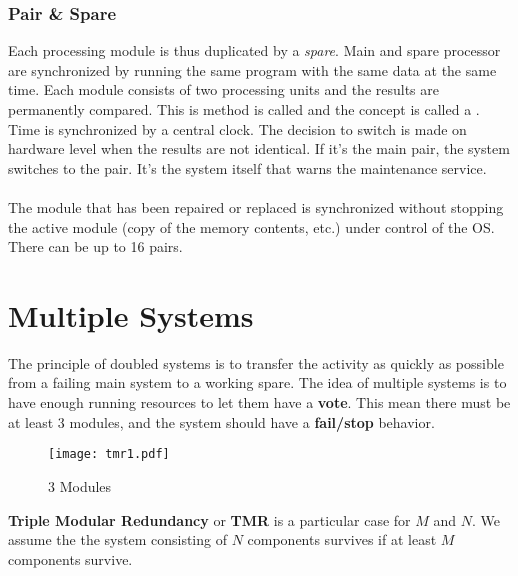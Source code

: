 \documentclass[../main.tex]{subfiles}
\begin{document}
\subsubsection{Pair \& Spare}
Each processing module is thus duplicated by a \textit{spare}.
Main and spare processor are synchronized by running the same program with the same data at the same time.
Each module consists of two processing units and the results are permanently compared.
This is method is called  and the concept is called a .
Time is synchronized by a central clock.
The decision to switch is made on hardware level when the results are not identical.
If it's the main pair, the system switches to the pair.
It's the system itself that warns the maintenance service. 
\\\\
The module that has been repaired or replaced is synchronized without stopping the active module (copy of the memory contents, etc.) under control of the OS. There can be up to 16 pairs.

\section{Multiple Systems}
The principle of doubled systems is to transfer the activity as quickly as possible from a failing main system to a working spare. The idea of multiple systems is to have enough running resources to let them have a \textbf{vote}. This mean there must be at least 3 modules, and the system should have a \textbf{fail/stop} behavior.

\begin{figure}[H]
    \centering
    \texttt{[image: tmr1.pdf]}
    \caption{3 Modules}
    \label{tmr1}
\end{figure}
\textbf{Triple Modular Redundancy} or \textbf{TMR} is a particular case for $M$ and $N$. We assume the the system consisting of $N$ components survives if at least $M$ components survive.
\end{document}
